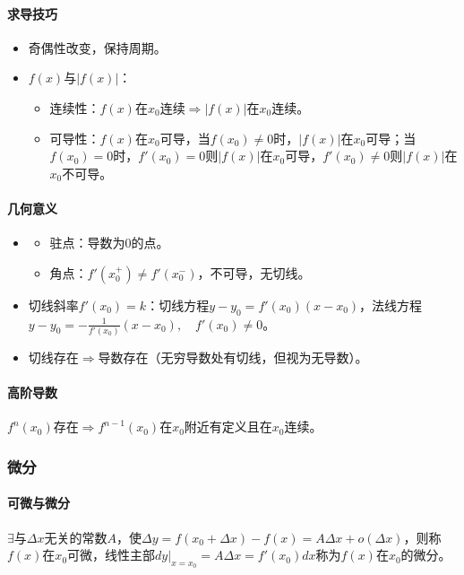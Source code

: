 \documentclass[
12pt, %
a4paper, 
oneside, %
]{scrartcl}
\begin{document}
\paragraph{求导技巧}
\begin{itemize}
\item 奇偶性改变，保持周期。
\item $ f(x) $与$ |f(x)| $：
\begin{itemize}
\item 连续性：$ f(x) $在$ x_0 $连续$ \Rightarrow $$ |f(x)| $在$ x_0 $连续。
\item 可导性：$ f(x) $在$ x_0 $可导，当$ f(x_0) \neq 0 $时，$ |f(x)| $在$ x_0 $可导；当$ f(x_0) = 0 $时，$ f'(x_0) = 0 $则$ |f(x)| $在$ x_0 $可导，$ f'(x_0) \neq 0 $则$ |f(x)| $在$ x_0 $不可导。
\end{itemize}
\end{itemize}
\paragraph{几何意义}
\begin{itemize}
\item 
\begin{itemize}
\item 驻点：导数为$ 0 $的点。
\item 角点：$ f'(x_0^+) \neq f'(x_0^-) $，不可导，无切线。
\end{itemize}
\item 切线斜率$ f'(x_0) = k $：切线方程$ y - y_0 = f'(x_0)(x - x_0) $，法线方程$ y - y_0 = -\frac{1}{f'(x_0)}(x - x_0), \quad f'(x_0) \neq 0 $。
\item 切线存在$ \Rightarrow $导数存在（无穷导数处有切线，但视为无导数）。
\end{itemize}
\paragraph{高阶导数}
$ f^{n}(x_0) $存在$ \Rightarrow $$ f^{n - 1}(x_0) $在$ x_0 $附近有定义且在$ x_0 $连续。
\subsubsection[微分]{微分}
\paragraph{可微与微分}
$ \exists $与$ \Delta x $无关的常数$ A $，使$ \Delta y = f(x_0 + \Delta x) - f(x) = A \Delta x + o(\Delta x) $，则称$ f(x) $在$ x_0 $可微，线性主部$ d y|_{x = x_0} = A \Delta x = f'(x_0) d x $称为$ f(x) $在$ x_0 $的微分。
\end{document}
